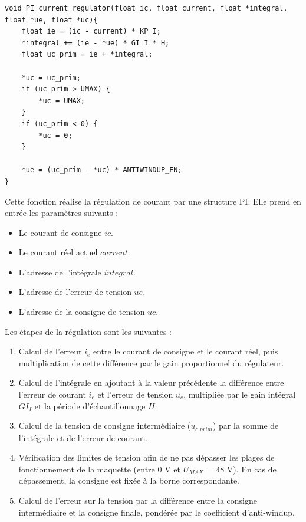 \begin{verbatim}
void PI_current_regulator(float ic, float current, float *integral,
float *ue, float *uc){
    float ie = (ic - current) * KP_I;
    *integral += (ie - *ue) * GI_I * H;
    float uc_prim = ie + *integral;

    *uc = uc_prim;
    if (uc_prim > UMAX) {
        *uc = UMAX;
    }
    if (uc_prim < 0) {
        *uc = 0;
    }

    *ue = (uc_prim - *uc) * ANTIWINDUP_EN;
}
\end{verbatim}

Cette fonction réalise la régulation de courant par une structure PI. Elle prend en entrée les paramètres suivants :

\begin{itemize}
    \item Le courant de consigne $ic$.
    \item Le courant réel actuel $current$.
    \item L'adresse de l'intégrale $integral$.
    \item L'adresse de l'erreur de tension $ue$.
    \item L'adresse de la consigne de tension $uc$.
\end{itemize}

Les étapes de la régulation sont les suivantes :

\begin{enumerate}
    \item Calcul de l'erreur $i_e$ entre le courant de consigne et le courant réel, puis multiplication de cette différence par le gain proportionnel du régulateur.

    \item Calcul de l'intégrale en ajoutant à la valeur précédente la différence entre l'erreur de courant $i_e$ et l'erreur de tension $u_e$, multipliée par le gain intégral $GI_I$ et la période d'échantillonnage $H$.

    \item Calcul de la tension de consigne intermédiaire ($u_{c\_prim}$) par la somme de l'intégrale et de l'erreur de courant.

    \item Vérification des limites de tension afin de ne pas dépasser les plages de fonctionnement de la maquette (entre 0 V et $U_{MAX}$ = 48 V). En cas de dépassement, la consigne est fixée à la borne correspondante.

    \item Calcul de l'erreur sur la tension par la différence entre la consigne intermédiaire et la consigne finale, pondérée par le coefficient d'anti-windup.
\end{enumerate}

